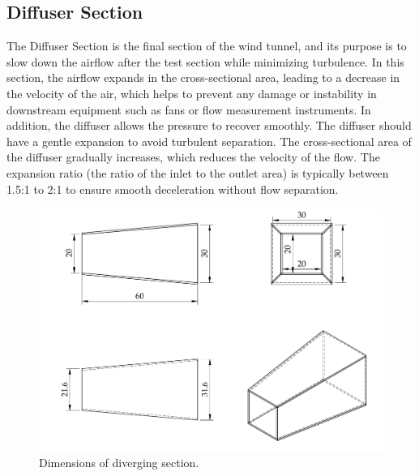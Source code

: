 \subsection{Diffuser Section}
The Diffuser Section is the final section of the wind tunnel, and its purpose is to slow down the airflow after the test section while minimizing turbulence. In this section, the airflow expands in the cross-sectional area, leading to a decrease in the velocity of the air, which helps to prevent any damage or instability in downstream equipment such as fans or flow measurement instruments. In addition, the diffuser allows the pressure to recover smoothly. The diffuser should have a gentle expansion to avoid turbulent separation. The cross-sectional area of the diffuser gradually increases, which reduces the velocity of the flow. The expansion ratio (the ratio of the inlet to the outlet area) is typically between 1.5:1 to 2:1 to ensure smooth deceleration without flow separation.
\begin{figure}[H]
    \centering
    \includegraphics[width=\linewidth]{gfx/Divergent_section_for_wind_tunnel.pdf}
    \caption{Dimensions of diverging section.}
    \label{fig:diverge section}
\end{figure}
